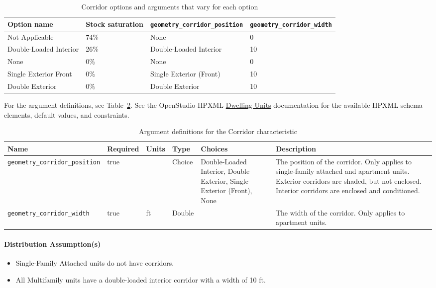\begin{longtable}[]{ |p{}|p{}|p{3cm}|p{3cm}| }
\caption{Corridor options and arguments that vary for each option} \label{table:hc_opt_corridor}  \\
\toprule\noalign{}
Option name & Stock saturation & \texttt{geometry\_corridor\_position} &
\texttt{geometry\_corridor\_width} \\
\midrule\noalign{}
\endhead
\bottomrule\noalign{}
\endlastfoot
Not Applicable & 74\% & None & 0 \\ \hline
Double-Loaded Interior & 26\% & Double-Loaded Interior & 10 \\ \hline
None & 0\% & None & 0 \\ \hline
Single Exterior Front & 0\% & Single Exterior (Front) & 10 \\ \hline
Double Exterior & 0\% & Double Exterior & 10 \\
\end{longtable}

For the argument definitions, see Table~\ref{table:hc_arg_def_corridor}. See the OpenStudio-HPXML \href{https://openstudio-hpxml.readthedocs.io/en/v1.8.1/workflow_inputs.html#dwelling-units}{Dwelling Units} documentation for the available HPXML schema elements, default values, and constraints.

\begin{longtable}[]{ |p{}|p{1.5cm}|p{1cm}|p{1.1cm}|p{1.4cm}|p{6cm}| }
\caption{Argument definitions for the Corridor characteristic} \label{table:hc_arg_def_corridor}  \\
\toprule\noalign{}
Name & Required & Units & Type & Choices & Description \\
\midrule\noalign{}
\endhead
\bottomrule\noalign{}
\endlastfoot
\texttt{geometry\_corridor\_position} & true & & Choice & Double-Loaded
Interior, Double Exterior, Single Exterior (Front), None & The position
of the corridor. Only applies to single-family attached and apartment
units. Exterior corridors are shaded, but not enclosed. Interior
corridors are enclosed and conditioned. \\
\hline
\texttt{geometry\_corridor\_width} & true & ft & Double & & The width of
the corridor. Only applies to apartment units. \\
\end{longtable}

\paragraph{Distribution Assumption(s)}
\begin{itemize}
    \item Single-Family Attached units do not have corridors.
    \item All Multifamily units have a double-loaded interior corridor with a width of 10 ft.
\end{itemize}


